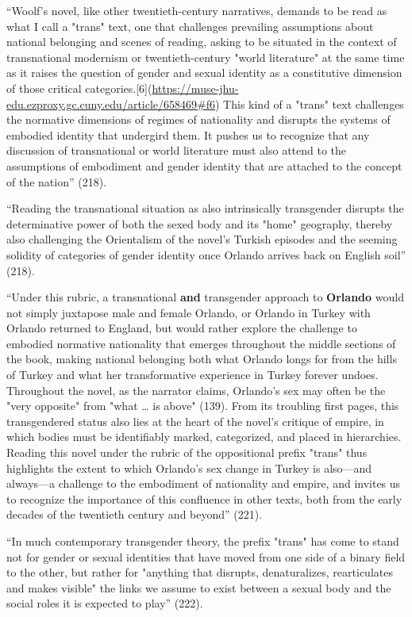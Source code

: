 \documentclass[11pt]{article}
\begin{document}
“Woolf's novel, like other twentieth-century narratives, demands to be
read as what I call a "trans" text, one that challenges prevailing
assumptions about national belonging and scenes of reading, asking to
be situated in the context of transnational modernism or
twentieth-century "world literature" at the same time as it raises the
question of gender and sexual identity as a constitutive dimension of
those critical
categories.[6](\url{https://muse-jhu-edu.ezproxy.gc.cuny.edu/article/658469\#f6})
This kind of a "trans" text challenges the normative dimensions of
regimes of nationality and disrupts the systems of embodied identity
that undergird them. It pushes us to recognize that any discussion of
transnational or world literature must also attend to the assumptions
of embodiment and gender identity that are attached to the concept of
the nation” (218).

“Reading the transnational situation as also intrinsically transgender
disrupts the determinative power of both the sexed body and its "home"
geography, thereby also challenging the Orientalism of the novel's
Turkish episodes and the seeming solidity of categories of gender
identity once Orlando arrives back on English soil” (218).

“Under this rubric, a transnational \textbf{and} transgender approach to
\textbf{Orlando} would not simply juxtapose male and female Orlando, or
Orlando in Turkey with Orlando returned to England, but would rather
explore the challenge to embodied normative nationality that emerges
throughout the middle sections of the book, making national belonging
both what Orlando longs for from the hills of Turkey and what her
transformative experience in Turkey forever undoes. Throughout the
novel, as the narrator claims, Orlando's sex may often be the "very
opposite" from "what … is above" (139). From its troubling first
pages, this transgendered status also lies at the heart of the novel's
critique of empire, in which bodies must be identifiably marked,
categorized, and placed in hierarchies. Reading this novel under the
rubric of the oppositional prefix "trans" thus highlights the extent
to which Orlando's sex change in Turkey is also—and always—a challenge
to the embodiment of nationality and empire, and invites us to
recognize the importance of this confluence in other texts, both from
the early decades of the twentieth century and beyond” (221).

“In much contemporary transgender theory, the prefix "trans" has come
to stand not for gender or sexual identities that have moved from one
side of a binary field to the other, but rather for "anything that
disrupts, denaturalizes, rearticulates and makes visible" the links we
assume to exist between a sexual body and the social roles it is
expected to play” (222).
\end{document}
